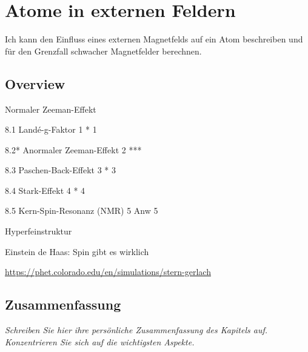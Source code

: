 \renewcommand{\lastmod}{10. September 2024}
\renewcommand{\chapterauthors}{Markus Lippitz}

\chapter{Atome in externen Feldern}





Ich kann den Einfluss eines externen Magnetfelds auf ein Atom beschreiben und für den Grenzfall schwacher Magnetfelder berechnen.

\section{Overview}


Normaler Zeeman-Effekt

8.1 Landé-g-Faktor 1	*	1 

8.2* Anormaler Zeeman-Effekt 2	***

8.3 Paschen-Back-Effekt 3	*	3 

8.4 Stark-Effekt 4	*	4 

8.5 Kern-Spin-Resonanz (NMR) 5	Anw	5 

Hyperfeinstruktur 


Einstein de Haas: Spin gibt es wirklich

\url{https://phet.colorado.edu/en/simulations/stern-gerlach}




\section{Zusammenfassung}

\textit{Schreiben Sie hier ihre persönliche Zusammenfassung des Kapitels auf. Konzentrieren Sie sich auf die wichtigsten Aspekte.}

\vspace*{10cm}

\printbibliography[segment=\therefsegment,heading=subbibliography]
